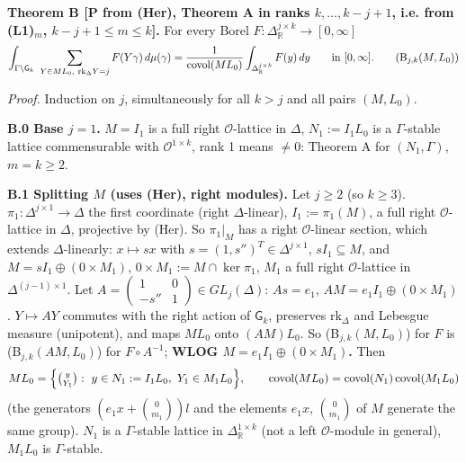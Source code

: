 \textbf{Theorem B {[}P from (Her), Theorem A in ranks \(k,\dots,k-j+1\), i.e. from (L1)\(_m\), \(k-j+1\le m\le k\){]}.} For every Borel \(F:\Delta_{\mathbb R}^{j\times k}\to[0,\infty]\)
\[\int_{\Gamma\backslash\mathsf G_k}\ \sum_{Y\in ML_0,\ \mathrm{rk}_\Delta Y=j}F(Y\gamma)\,d\mu(\gamma)=\frac1{\mathrm{covol}(ML_0)}\int_{\Delta_{\mathbb R}^{j\times k}}F(y)\,dy\qquad\text{in }[0,\infty].\tag{B$_{j,k}(M,L_0)$}\]

\emph{Proof.} Induction on \(j\), simultaneously for all \(k>j\) and all pairs \((M,L_0)\).

\textbf{B.0 Base \(j=1\).} \(M=I_1\) is a full right \(\mathcal O\)-lattice in \(\Delta\), \(N_1:=I_1L_0\) is a \(\Gamma\)-stable lattice commensurable with \(\mathcal O^{1\times k}\), rank 1 means \(\ne0\): Theorem A for \((N_1,\Gamma)\), \(m=k\ge2\).

\textbf{B.1 Splitting \(M\) (uses (Her), right modules).} Let \(j\ge2\) (so \(k\ge3\)). \(\pi_1:\Delta^{j\times1}\to\Delta\) the first coordinate (right \(\Delta\)-linear), \(I_1:=\pi_1(M)\), a full right \(\mathcal O\)-lattice in \(\Delta\), projective by (Her). So \(\pi_1|_M\) has a right \(\mathcal O\)-linear section, which extends \(\Delta\)-linearly: \(x\mapsto sx\) with \(s=(1,s'')^T\in\Delta^{j\times1}\), \(sI_1\subseteq M\), and \(M=sI_1\oplus(0\times M_1)\), \(0\times M_1:=M\cap\ker\pi_1\), \(M_1\) a full right \(\mathcal O\)-lattice in \(\Delta^{(j-1)\times1}\). Let \(A=\begin{pmatrix}1&0\\-s''&1\end{pmatrix}\in GL_j(\Delta)\): \(As=e_1\), \(AM=e_1I_1\oplus(0\times M_1)\). \(Y\mapsto AY\) commutes with the right action of \(\mathsf G_k\), preserves \(\mathrm{rk}_\Delta\) and Lebesgue measure (unipotent), and maps \(ML_0\) onto \((AM)L_0\). So (B\(_{j,k}(M,L_0)\)) for \(F\) is (B\(_{j,k}(AM,L_0)\)) for \(F\circ A^{-1}\); \textbf{WLOG \(M=e_1I_1\oplus(0\times M_1)\).} Then
\[ML_0=\Big\{\tbinom{y}{Y_1}:\ y\in N_1:=I_1L_0,\ Y_1\in M_1L_0\Big\},\qquad \mathrm{covol}(ML_0)=\mathrm{covol}(N_1)\,\mathrm{covol}(M_1L_0)\]
(the generators \((e_1x+\binom0{m_1})l\) and the elements \(e_1x\), \(\binom0{m_1}\) of \(M\) generate the same group). \(N_1\) is a \(\Gamma\)-stable lattice in \(\Delta_{\mathbb R}^{1\times k}\) (not a left \(\mathcal O\)-module in general), \(M_1L_0\) is \(\Gamma\)-stable.

